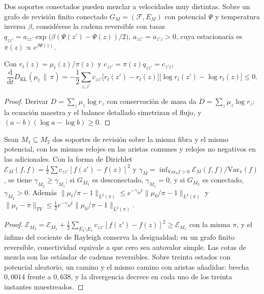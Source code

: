 Dos soportes conectados pueden mezclar a velocidades muy distintas. Sobre un
grafo de revisión finito conectado $G_M=(\mathcal F,E_M)$ con potencial $\Psi$
y temperatura inversa $\beta$, considérese la cadena reversible con tasas
$q_{zz'}=a_{zz'}\exp\bigl(\beta(\Psi(z')-\Psi(z))/2\bigr)$, $a_{zz'}=a_{z'z}>0$,
cuya estacionaria es $\pi(z)\propto e^{\beta\Psi(z)}$.

\begin{teorema}
\label{th:energia-libre}
Con $r_t(z)=\mu_t(z)/\pi(z)$ y $c_{zz'}=\pi(z)q_{zz'}=c_{z'z}$,
\begin{equation}
  \label{eq:energia-libre}
  \frac{\mathrm d}{\mathrm dt}D_{\mathrm{KL}}(\mu_t\,\|\,\pi)
  =-\frac12\sum_{z,z'}c_{zz'}\bigl[r_t(z')-r_t(z)\bigr]\bigl[\log r_t(z')-\log r_t(z)\bigr]\le0 .
\end{equation}
\end{teorema}

\begin{proof}
Derivar $D=\sum_z\mu_z\log r_z$ con conservación de masa da
$\dot D=\sum_z\dot\mu_z\log r_z$; la ecuación maestra y el balance detallado
simetrizan el flujo, y $(a-b)(\log a-\log b)\ge0$.
\end{proof}

\begin{teorema}
\label{th:gap-monotono}
Sean $M_1\subseteq M_2$ dos soportes de revisión sobre la misma fibra y el
mismo potencial, con los mismos relojes en las aristas comunes y relojes no
negativos en las adicionales. Con la forma de Dirichlet
$\mathcal E_M(f,f)=\tfrac12\sum c_{zz'}[f(z')-f(z)]^2$ y
$\gamma_M=\inf_{\mathrm{Var}_\pi f>0}\mathcal E_M(f,f)/\mathrm{Var}_\pi(f)$,
se tiene $\gamma_{M_2}\ge\gamma_{M_1}$; si $G_{M_1}$ es desconectado,
$\gamma_{M_1}=0$, y si $G_{M_2}$ es conectado, $\gamma_{M_2}>0$. Además
$\lVert\mu_t/\pi-1\rVert_{L^2(\pi)}\le e^{-\gamma_Mt}\lVert\mu_0/\pi-1\rVert_{L^2(\pi)}$
y $\lVert\mu_t-\pi\rVert_{TV}\le\tfrac12e^{-\gamma_Mt}\lVert\mu_0/\pi-1\rVert_{L^2(\pi)}$.
\end{teorema}

\begin{proof}
$\mathcal E_{M_2}=\mathcal E_{M_1}+\tfrac12\sum_{E_2\setminus E_1}c_{zz'}[f(z')-f(z)]^2\ge\mathcal E_{M_1}$
con la misma $\pi$, y el ínfimo del cociente de Rayleigh conserva la
desigualdad; en un grafo finito reversible, conectividad equivale a que cero
sea autovalor simple. Las cotas de mezcla son las estándar de cadenas
reversibles. Sobre treinta estados con potencial aleatorio, un camino y el
mismo camino con aristas añadidas: brecha $0{,}0014$ frente a $0{,}638$, y la
divergencia decrece en cada uno de los treinta instantes muestreados.
\end{proof}

